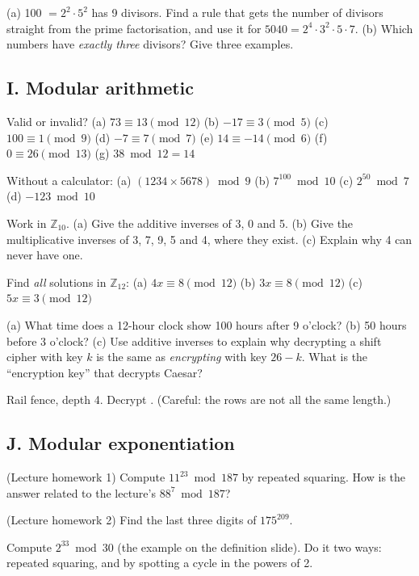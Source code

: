 \q (a) 100 $= 2^2 \cdot 5^2$ has 9 divisors. Find a rule that gets the number of divisors straight from the prime factorisation, and use it for $5040 = 2^4 \cdot 3^2 \cdot 5 \cdot 7$.
(b) Which numbers have \emph{exactly three} divisors? Give three examples.

\subsection*{I. Modular arithmetic}

\q Valid or invalid? (a) $73 \equiv 13 \pmod{12}$ \quad (b) $-17 \equiv 3 \pmod 5$ \quad (c) $100 \equiv 1 \pmod 9$ \quad (d) $-7 \equiv 7 \pmod 7$ \quad (e) $14 \equiv -14 \pmod 6$ \quad (f) $0 \equiv 26 \pmod{13}$ \quad (g) $38 \bmod 12 = 14$

\q Without a calculator: (a) $(1234 \times 5678) \bmod 9$ \quad (b) $7^{100} \bmod 10$ \quad (c) $2^{50} \bmod 7$ \quad (d) $-123 \bmod 10$

\q Work in $\mathbb{Z}_{10}$. (a) Give the additive inverses of 3, 0 and 5.
(b) Give the multiplicative inverses of 3, 7, 9, 5 and 4, where they exist. (c) Explain why 4 can never have one.

\q Find \emph{all} solutions in $\mathbb{Z}_{12}$: (a) $4x \equiv 8 \pmod{12}$ \quad (b) $3x \equiv 8 \pmod{12}$ \quad (c) $5x \equiv 3 \pmod{12}$

\q (a) What time does a 12-hour clock show 100 hours after 9 o'clock? (b) 50 hours before 3 o'clock?
(c) Use additive inverses to explain why decrypting a shift cipher with key $k$ is the same as \emph{encrypting} with key $26 - k$. What is the ``encryption key'' that decrypts Caesar?

\q Rail fence, depth 4. Decrypt . (Careful: the rows are not all the same length.)

\subsection*{J. Modular exponentiation}

\q (Lecture homework 1) Compute $11^{23} \bmod 187$ by repeated squaring. How is the answer related to the lecture's $88^7 \bmod 187$?

\q (Lecture homework 2) Find the last three digits of $175^{209}$.

\q Compute $2^{33} \bmod 30$ (the example on the definition slide). Do it two ways: repeated squaring, and by spotting a cycle in the powers of 2.

